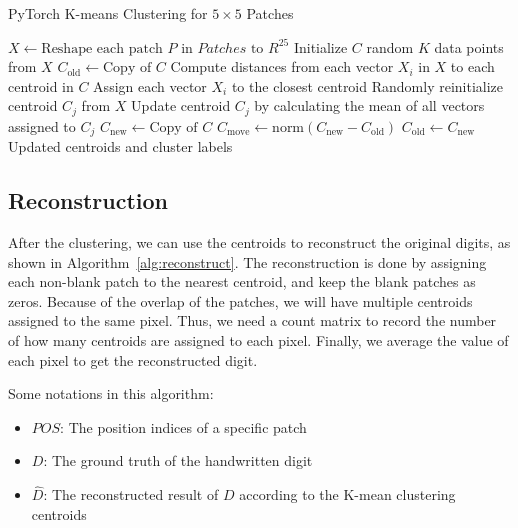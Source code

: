 \documentclass{article}
\begin{document}
\begin{algorithm}
\caption{PyTorch K-means Clustering for $5 \times 5$ Patches}\label{alg:kmeans}
\begin{algorithmic}[1]
    \State $X \gets \text{Reshape each patch } P \text{ in } Patches \text{ to } R^{25}$ 
    \State Initialize $C$ random $K$ data points from $X$
    \State $C_{\text{old}} \gets \text{Copy of } C$
    \Repeat
        \State Compute distances from each vector $X_i$ in $X$ to each centroid in $C$
        \State Assign each vector $X_i$ to the closest centroid
                \State Randomly reinitialize centroid $C_j$ from $X$
            \Else
                \State Update centroid $C_j$ by calculating the mean of all vectors assigned to $C_j$
            \EndIf
        \EndFor
        \State $C_{\text{new}} \gets \text{Copy of } C$
        \State $C_{\text{move}} \gets \text{norm}(C_{\text{new}} - C_{\text{old}})$
        \State $C_{\text{old}} \gets C_{\text{new}}$
    \State \Return Updated centroids and cluster labels
\EndProcedure
\end{algorithmic}
\end{algorithm}


\subsection{Reconstruction}

After the clustering, we can use the centroids to reconstruct the original digits, as shown in Algorithm~\ref{alg:reconstruct}.
The reconstruction is done by assigning each non-blank patch to the nearest centroid, and keep the blank patches as zeros.
Because of the overlap of the patches, we will have multiple centroids assigned to the same pixel.
Thus, we need a count matrix to record the number of how many centroids are assigned to each pixel.
Finally, we average the value of each pixel to get the reconstructed digit.

Some notations in this algorithm:

\begin{itemize}
    \item $POS$: The position indices of a specific patch
    \item $D$: The ground truth of the handwritten digit 
    \item $\hat{D}$: The reconstructed result of $D$ according to the K-mean clustering centroids
\end{itemize}
\end{document}
